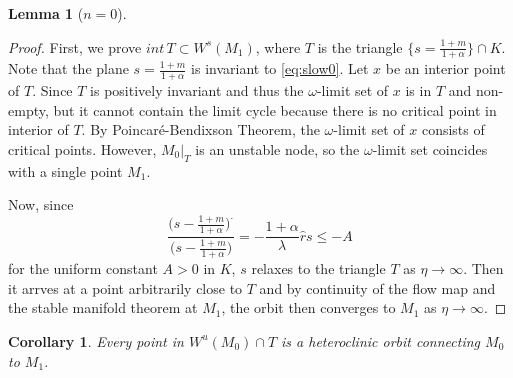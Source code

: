 \documentclass[a4paper,11pt]{article}
\newtheorem{lemma}{Lemma}[section]
\newtheorem{corollary}{Corollary}[section]
\begin{document}
{\begin{lemma}[$n=0$]
\end{lemma}
\begin{proof}
 First, we prove ${int}\, T \subset W^s(M_1)$, where $T$ is the triangle $\{s=\frac{1+m}{1+\alpha}\} \cap K$. Note that the plane $s=\frac{1+m}{1+\alpha}$ is invariant to \eqref{eq:slow0}. Let $x$ be an interior point of $T$. Since $T$ is positively invariant and thus the $\omega$-limit set of $x$ is in $T$ and non-empty, but it cannot contain the limit cycle because there is no critical point in interior of $T$. By Poincar\'e-Bendixson Theorem, the $\omega$-limit set of $x$ consists of critical points. However, $M_0|_T$ is an unstable node, so the $\omega$-limit set coincides with a single point $M_1$.
 
 Now, since 
 $$\frac{\big(s- \frac{1+m}{1+\alpha}\big)^{\cdot}}{\big(s- \frac{1+m}{1+\alpha}\big)} = -\frac{1+\alpha}{\lambda}\hat{r}s\le -A$$
 for the uniform constant $A>0$ in $K$, $s$ relaxes to the triangle $T$ as $\eta \rightarrow \infty$. Then it arrves at a point arbitrarily close to $T$ and by continuity of the flow map and the stable manifold theorem at $M_1$, the orbit then converges to $M_1$ as $\eta \rightarrow \infty$. %
\end{proof}
\begin{corollary}
 Every point in $W^u(M_0)\cap T$ is a heteroclinic orbit connecting $M_0$ to $M_1$.
\end{corollary}

}
\end{document}
